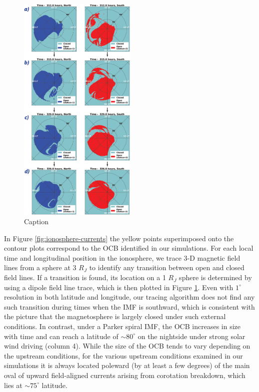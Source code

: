 \begin{figure}
    \centering
    \includegraphics[width=0.5\textwidth]{images4/open-flux-variation.jpg}
    \caption{Caption}
    \label{fig:open-flux-hemisphere}
\end{figure}

In Figure \ref{fig:ionosphere-currents} the yellow points superimposed onto the contour plots correspond to the OCB identified in our simulations. For each local time and longitudinal position in the ionosphere, we trace 3‐D magnetic field lines from a sphere at 3 $R_J$ to identify any transition between open and closed field lines. If a transition is found, its location on a 1 $R_J$ sphere is determined by using a dipole field line trace, which is then plotted in Figure \ref{fig:open-flux-hemisphere}. Even with $1^\circ$ resolution in both latitude and longitude, our tracing algorithm does not find any such transition during times when the IMF is southward, which is consistent with the picture that the magnetosphere is largely closed under such external conditions. In contrast, under a Parker spiral IMF, the OCB increases in size with time and can reach a latitude of $\sim80^\circ$ on the nightside under strong solar wind driving (column 4). While the size of the OCB tends to vary depending on the upstream conditions, for the various upstream conditions examined in our simulations it is always located poleward (by at least a few degrees) of the main oval of upward field‐aligned currents arising from corotation breakdown, which lies at $\sim75^\circ$ latitude. 

